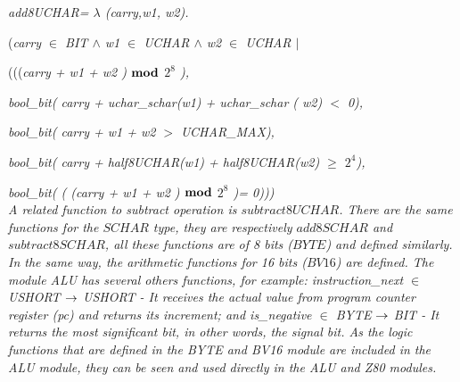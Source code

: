 \documentclass[a4paper]{llncs}
\begin{document}
\hspace*{0.0in}\it add8UCHAR\rm = $\lambda$ \rm(\it carry\rm,\it w1\rm, \it w2\rm)\rm.\rm

\hspace*{0.0in}(\it carry $\in$  \it BIT  $\land$  \it w1  $\in$  \it UCHAR  $\land$  \it w2  $\in$  \it UCHAR
$\mid$

\hspace*{0.40in}\rm(\rm(\rm(\it carry \rm + \it w1 \rm + \it w2 \rm )  $\mod$  \it $2^{8}$ \rm ),

\hspace*{0.40in}\it bool\_bit\rm ( \it carry \rm + \it uchar\_schar\rm (\it w1\rm ) \rm + \it uchar\_schar \rm (\it
w2\rm ) $<$ \rm 0\rm ),

\hspace*{0.40in}\it bool\_bit\rm ( \it carry \rm + \it w1 \rm + \it w2 $>$ \it UCHAR\_MAX\rm )\rm ,

\hspace*{0.40in}\it bool\_bit\rm ( \it carry \rm + \it half8UCHAR\rm (\it w1\rm) \rm + \it half8UCHAR\rm (\it w2\rm)  $\geq$  \it $2^{4}$\rm )\rm,

\hspace*{0.40in}\it bool\_bit\rm ( \rm ( \rm (\it carry \rm + \it w1 \rm + \it w2 \rm )  $\mod$  \it $2^{8}$ \rm
)\rm = \rm 0\rm )\rm )\hspace*{0.10in}\rm )\\



A related function to subtract operation is $\textit{subtract8UCHAR}$. There are the same functions for the
$\textit{SCHAR}$ type, they are respectively $\textit{add8SCHAR}$ and $\textit{subtract8SCHAR}$, all these
functions are of 8 bits ($\textit{BYTE}$) and defined similarly. In the same way, the arithmetic functions for 16
bits ($\textit{BV16}$) are defined.
The module ALU has several others functions, for example:%
\it instruction\_next  $\in$  USHORT  $\fun$  USHORT \rm - It receives the  
  actual value from program counter register (\textit{pc}) and returns its increment;
and \it is\_negative  $\in$  \it BYTE  $\fun$  \it BIT \rm - It returns the most significant bit,
 in other words, the signal bit.
As the logic functions that are defined in the \textit{BYTE} and \textit{BV16}
module are included in the \textit{ALU} module, they can be seen and used
directly in the \textit{ALU} and \textit{Z80} modules.
\end{document}
